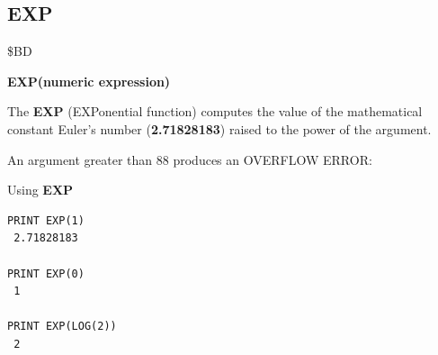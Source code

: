 \subsection{EXP}
\begin{description}[leftmargin=2cm,style=nextline]
\item [Token:] \$BD
\item [Format:] {\bf EXP(numeric expression)}
\item [Usage:] The {\bf EXP} (EXPonential function) computes
               the value of the mathematical constant
               Euler's number ({\bf 2.71828183})
               raised to the power of the
               argument.

\item [Remarks:] An argument greater than 88 produces
                 an OVERFLOW ERROR:
\item [Examples:] Using {\bf EXP}
\begin{tcolorbox}[colback=black,coltext=white]
\verbatimfont{\codefont}
\begin{verbatim}
PRINT EXP(1)
 2.71828183

PRINT EXP(0)
 1

PRINT EXP(LOG(2))
 2
\end{verbatim}
\end{tcolorbox}
\end{description}


\newpage
